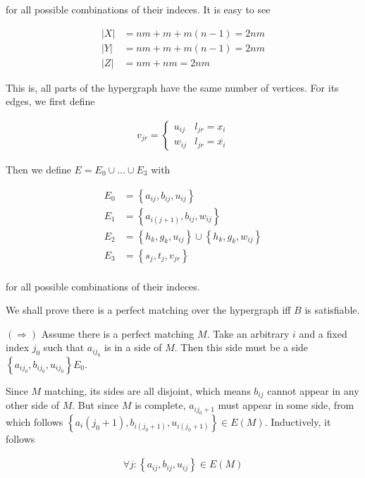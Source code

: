 \documentclass[a4paper]{article}
\begin{document}
for all possible combinations of their indeces. It is easy to see 

\begin{align*}
    |X| &= nm + m + m(n-1) = 2nm \\ 
    |Y| &= nm + m + m(n-1) = 2nm \\ 
    |Z| &= nm + nm = 2nm
\end{align*}

This is, all parts of the hypergraph have the same number of vertices. For its edges,
we first define 

\begin{align*}
    v_{jr} = \begin{cases}
        u_{ij} & l_{jr} = x_i \\ 
        w_{ij} & l_{jr} = \overline{x_i} 
    \end{cases}
\end{align*}

Then we define $E = E_0 \cup \ldots \cup  E_3$ with

\begin{align*}
    E_0 &= \left\{ a_{ij}, b_{ij}, u_{ij} \right\} \\
    E_1 &= \left\{ a_{i(j+1)}, b_{ij}, w_{ij} \right\} \\
    E_2 &= \left\{ h_k, g_k, u_{ij} \right\} \cup \left\{ h_k, g_k, w_{ij} \right\} \\
    E_3 &= \left\{ s_j, t_j, v_{jr} \right\} \\
\end{align*}

for all possible combinations of their indeces.

We shall prove there is a perfect matching over the hypergraph iff $B$
is satisfiable.

$(\Rightarrow)$ Assume there is a perfect matching $M$. Take an arbitrary $i$
and a fixed index $j_0$ such that $a_{ij_0}$ is in a side of $M$. Then this
side must be a side $\left\{ a_{ij_0}, b_{ij_0}, u_{ij_0} \right\} E_0$.

Since $M$ matching, its sides are all disjoint, which means $b_{ij}$
cannot appear in any other side of $M$. But since $M$ is complete, 
$a_{ij_0+1}$ must appear in some side, from which follows 
$\left\{ a_i(j_0+1), b_{ i(j_0+1) }, u_{i(j_0+1)} \right\} \in E(M)$.
Inductively, it follows 

\begin{align*}
    \forall j : \left\{ a_{ij}, b_{ij}, u_{ij} \right\} \in E(M) 
\end{align*}
\end{document}
